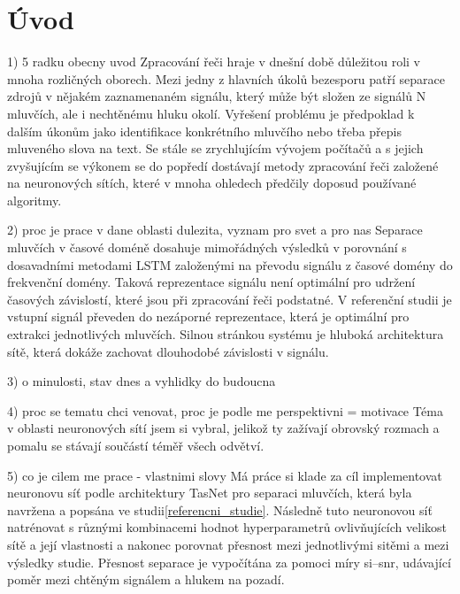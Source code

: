 \chapter{Úvod}


1) 5 radku obecny uvod
Zpracování řeči hraje v dnešní době důležitou roli v mnoha rozličných oborech. Mezi jedny z hlavních úkolů bezesporu patří separace zdrojů v nějakém zaznamenaném signálu, který může být složen ze signálů N mluvčích, ale i nechtěnému hluku okolí. Vyřešení problému je předpoklad k dalším úkonům jako identifikace konkrétního mluvčího nebo třeba přepis mluveného slova na text. Se stále se zrychlujícím vývojem počítačů a s jejich zvyšujícím se výkonem se do popředí dostávají metody zpracování řeči založené na neuronových sítích, které v mnoha ohledech předčily doposud používané algoritmy.

2) proc je prace v dane oblasti dulezita, vyznam pro svet a pro nas
Separace mluvčích v časové doméně dosahuje mimořádných výsledků v porovnání s dosavadními metodami LSTM založenými na převodu signálu z časové domény do frekvenční domény. Taková reprezentace signálu není optimální pro udržení časových závislostí, které jsou při zpracování řeči podstatné. V referenční studii je vstupní signál převeden do nezáporné reprezentace, která je optimální pro extrakci jednotlivých mluvčích. Silnou stránkou systému je hluboká architektura sítě, která dokáže zachovat dlouhodobé závislosti v signálu.

3) o minulosti, stav dnes a vyhlidky do budoucna


4) proc se tematu chci venovat, proc je podle me perspektivni = motivace
Téma v oblasti neuronových sítí jsem si vybral, jelikož ty zažívají obrovský rozmach a pomalu se stávají součástí téměř všech odvětví.


5) co je cilem me prace - vlastnimi slovy
Má práce si klade za cíl implementovat neuronovu síť podle architektury TasNet pro separaci mluvčích, která byla navržena a popsána ve studii\ref{referencni_studie}. Následně tuto neuronovou síť natrénovat s různými kombinacemi hodnot hyperparametrů ovlivňujících velikost sítě a její vlastnosti a nakonec porovnat přesnost mezi jednotlivými sitěmi a mezi výsledky studie. Přesnost separace je vypočítána za pomoci míry si--snr, udávající poměr mezi chtěným signálem a hlukem na pozadí.


